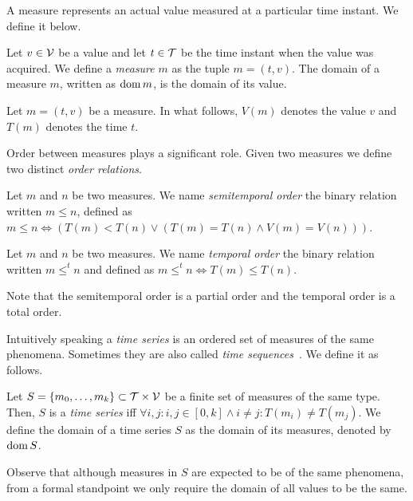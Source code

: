 A measure represents an actual value measured at a particular time
instant. We define it below.

\begin{definition}[Measure]
  Let $v\in\cal{V}$ be a value and let $t\in\cal{T}$ be the time
  instant when the value was acquired. We define a \emph{measure} $m$
  as the tuple $m=(t,v)$. The domain of a measure $m$, written as
  $\operatorname{dom} m$, is the domain of its value.
\end{definition}

Let $m = (t,v)$ be a measure. In what follows, $V(m)$ denotes the
value $v$ and $T(m)$ denotes the time $t$.

Order between measures plays a significant role. Given two measures we
define two distinct \emph{order relations}.

\begin{definition}\label{def:semitemporal_order}
  Let $m$ and $n$ be two measures. We name \emph{semitemporal order}
  the binary relation written $m\leq n$, defined as $m\leq n\iff
  (T(m)<T(n) \vee ( T(m)=T(n) \wedge V(m) = V(n) ))$.
\end{definition}

\begin{definition}\label{def:temporal_order}
  Let $m$ and $n$ be two measures. We name \emph{temporal order} the
  binary relation written $m \leq^t n$ and defined as $m \leq^t n \iff
  T(m) \leq T(n)$.
\end{definition}

Note that the semitemporal order is a partial order and the temporal
order is a total order.

Intuitively speaking a \emph{time series} is an ordered set of measures
of the same phenomena.  Sometimes they are also called \emph{time
  sequences}~\cite{last:hetland}. We define it as follows.

\begin{definition}
  \label{def:model:timeseries}
  Let $S = \{m_0,\ldots,m_k\}\subset\cal{T}\times\cal{V}$ be a finite
  set of measures of the same type. Then, $S$ is a \emph{time series}
  iff $\forall i,j: i,j\in[0,k] \wedge i\neq j: T(m_i)\neq T(m_j)$. We
  define the domain of a time series $S$ as the domain of its
  measures, denoted by $\operatorname{dom} S$.
\end{definition}

Observe that although measures in $S$ are expected to be of the same
phenomena, from a formal standpoint we only require the domain of all
values to be the same.

